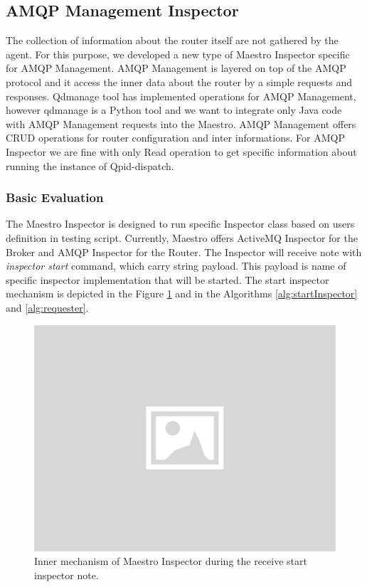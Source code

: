 
\subsection{AMQP Management Inspector}
\label{AMQP Management Inspector}
The collection of information about the router itself are not gathered by the agent. For this purpose, we developed a new type of Maestro Inspector specific for AMQP Management. AMQP Management is layered on top of the AMQP protocol and it access the inner data about the router by a simple requests and responses. Qdmanage tool has implemented operations for AMQP Management, however qdmanage is a Python tool and we want to integrate only Java code with AMQP Management requests into the Maestro. AMQP Management offers CRUD operations for router configuration and inter informations. For AMQP Inspector we are fine with only Read operation to get specific information about running the instance of Qpid-dispatch.

\subsubsection*{Basic Evaluation}

The Maestro Inspector is designed to run specific Inspector class based on users definition in testing script. Currently, Maestro offers ActiveMQ Inspector for the Broker and AMQP Inspector for the Router. The Inspector will receive note with \emph{inspector start} command, which carry string payload. This payload is name of specific inspector implementation that will be started. The start inspector mechanism is depicted in the Figure \ref{fig:inspector_start} and in the Algorithms \ref{alg:startInspector} and \ref{alg:requester}.

\begin{figure}[H]
  \centering
  \includegraphics[width=13cm]{obrazky-figures/placeholder.png}
  \caption{Inner mechanism of Maestro Inspector during the receive start inspector note.}
  \label{fig:inspector_start}
\end{figure}

